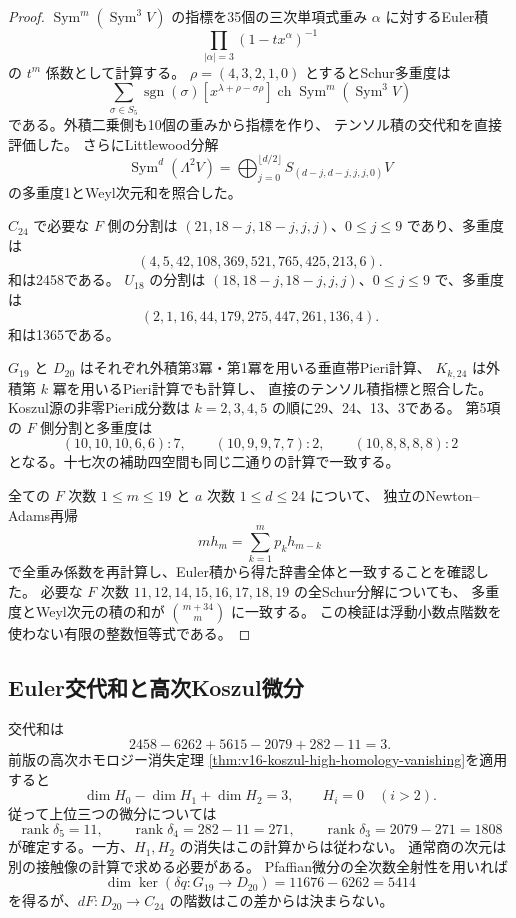 \begin{proof}
$\operatorname{Sym}^m(\operatorname{Sym}^3V)$ の指標を35個の三次単項式重み
$\alpha$ に対するEuler積
\[
 \prod_{|\alpha|=3}(1-tx^\alpha)^{-1}
\]
の $t^m$ 係数として計算する。
$\rho=(4,3,2,1,0)$ とするとSchur多重度は
\[
 \sum_{\sigma\in S_5}\operatorname{sgn}(\sigma)
 [x^{\lambda+\rho-\sigma\rho}]
 \operatorname{ch}\operatorname{Sym}^m(\operatorname{Sym}^3V)
\]
である。外積二乗側も10個の重みから指標を作り、
テンソル積の交代和を直接評価した。
さらにLittlewood分解
\[
 \operatorname{Sym}^{d}(\Lambda^2V)
 =\bigoplus_{j=0}^{\lfloor d/2\rfloor}S_{(d-j,d-j,j,j,0)}V
\]
の多重度1とWeyl次元和を照合した。

$C_{24}$ で必要な $F$ 側の分割は
$(21,18-j,18-j,j,j)$、$0\leq j\leq9$ であり、多重度は
\[
 (4,5,42,108,369,521,765,425,213,6).
\]
和は2458である。
$U_{18}$ の分割は $(18,18-j,18-j,j,j)$、$0\leq j\leq9$ で、多重度は
\[
 (2,1,16,44,179,275,447,261,136,4).
\]
和は1365である。

$G_{19}$ と $D_{20}$ はそれぞれ外積第3冪・第1冪を用いる垂直帯Pieri計算、
$K_{k,24}$ は外積第 $k$ 冪を用いるPieri計算でも計算し、
直接のテンソル積指標と照合した。
Koszul源の非零Pieri成分数は $k=2,3,4,5$ の順に29、24、13、3である。
第5項の $F$ 側分割と多重度は
\[
 (10,10,10,6,6):7,\qquad
 (10,9,9,7,7):2,\qquad
 (10,8,8,8,8):2
\]
となる。十七次の補助四空間も同じ二通りの計算で一致する。

全ての $F$ 次数 $1\leq m\leq19$ と $a$ 次数 $1\leq d\leq24$ について、
独立のNewton--Adams再帰
\[
 m h_m=\sum_{k=1}^{m}p_kh_{m-k}
\]
で全重み係数を再計算し、Euler積から得た辞書全体と一致することを確認した。
必要な $F$ 次数 $11,12,14,15,16,17,18,19$ の全Schur分解についても、
多重度とWeyl次元の積の和が $\binom{m+34}{m}$ に一致する。
この検証は浮動小数点階数を使わない有限の整数恒等式である。
\end{proof}

\subsection{Euler交代和と高次Koszul微分}

交代和は
\[
 2458-6262+5615-2079+282-11=3.
\]
前版の高次ホモロジー消失定理
\ref{thm:v16-koszul-high-homology-vanishing}を適用すると
\[
 \dim H_0-\dim H_1+\dim H_2=3,
 \qquad H_i=0\quad(i>2).
\]
従って上位三つの微分については
\[
 \operatorname{rank}\delta_5=11,\qquad
 \operatorname{rank}\delta_4=282-11=271,\qquad
 \operatorname{rank}\delta_3=2079-271=1808
\]
が確定する。一方、$H_1,H_2$ の消失はこの計算からは従わない。
通常商の次元は別の接触像の計算で求める必要がある。
Pfaffian微分の全次数全射性を用いれば
\[
 \dim\ker(\delta q:G_{19}\longrightarrow D_{20})=11676-6262=5414
\]
を得るが、$dF:D_{20}\to C_{24}$ の階数はこの差からは決まらない。

